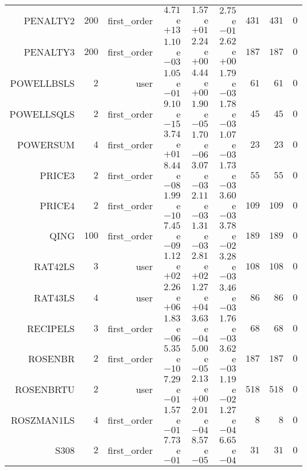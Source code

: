 \begin{longtable}{rrrrrrrrr}
PENALTY2 & \(   200\) & first\_order & \( 4.71\)e\(+13\) & \( 1.57\)e\(+01\) & \( 2.75\)e\(-01\) & \(   431\) & \(   431\) & \(     0\) \\
PENALTY3 & \(   200\) & first\_order & \( 1.10\)e\(-03\) & \( 2.24\)e\(+00\) & \( 2.62\)e\(+00\) & \(   187\) & \(   187\) & \(     0\) \\
POWELLBSLS & \(     2\) & user & \( 1.05\)e\(-01\) & \( 4.44\)e\(+00\) & \( 1.79\)e\(-03\) & \(    61\) & \(    61\) & \(     0\) \\
POWELLSQLS & \(     2\) & first\_order & \( 9.10\)e\(-15\) & \( 1.90\)e\(-05\) & \( 1.78\)e\(-03\) & \(    45\) & \(    45\) & \(     0\) \\
POWERSUM & \(     4\) & first\_order & \( 3.74\)e\(+01\) & \( 1.70\)e\(-06\) & \( 1.07\)e\(-03\) & \(    23\) & \(    23\) & \(     0\) \\
PRICE3 & \(     2\) & first\_order & \( 8.44\)e\(-08\) & \( 3.07\)e\(-03\) & \( 1.73\)e\(-03\) & \(    55\) & \(    55\) & \(     0\) \\
PRICE4 & \(     2\) & first\_order & \( 1.99\)e\(-10\) & \( 2.11\)e\(-03\) & \( 3.60\)e\(-03\) & \(   109\) & \(   109\) & \(     0\) \\
QING & \(   100\) & first\_order & \( 7.45\)e\(-09\) & \( 1.31\)e\(-03\) & \( 3.78\)e\(-02\) & \(   189\) & \(   189\) & \(     0\) \\
RAT42LS & \(     3\) & user & \( 1.12\)e\(+02\) & \( 2.81\)e\(+02\) & \( 3.28\)e\(-03\) & \(   108\) & \(   108\) & \(     0\) \\
RAT43LS & \(     4\) & user & \( 2.26\)e\(+06\) & \( 1.27\)e\(+04\) & \( 3.46\)e\(-03\) & \(    86\) & \(    86\) & \(     0\) \\
RECIPELS & \(     3\) & first\_order & \( 1.83\)e\(-06\) & \( 3.63\)e\(-04\) & \( 1.76\)e\(-03\) & \(    68\) & \(    68\) & \(     0\) \\
ROSENBR & \(     2\) & first\_order & \( 5.35\)e\(-10\) & \( 5.00\)e\(-05\) & \( 3.62\)e\(-03\) & \(   187\) & \(   187\) & \(     0\) \\
ROSENBRTU & \(     2\) & user & \( 7.29\)e\(-01\) & \( 2.13\)e\(+00\) & \( 1.19\)e\(-02\) & \(   518\) & \(   518\) & \(     0\) \\
ROSZMAN1LS & \(     4\) & first\_order & \( 1.57\)e\(-01\) & \( 2.01\)e\(-04\) & \( 1.27\)e\(-04\) & \(     8\) & \(     8\) & \(     0\) \\
S308 & \(     2\) & first\_order & \( 7.73\)e\(-01\) & \( 8.57\)e\(-05\) & \( 6.65\)e\(-04\) & \(    31\) & \(    31\) & \(     0\) \\

\end{longtable}
